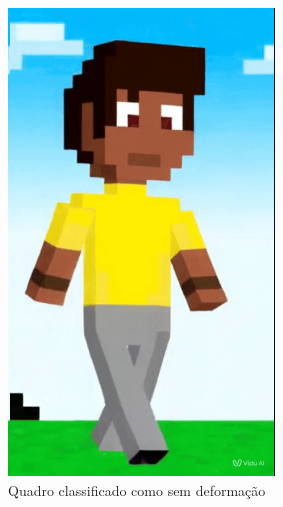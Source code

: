 \begin{figure}[htbp]
    \centering
    \caption{\small Quadros do Vídeo 2 (3D) em cada um dos níveis de deformação}
    \label{fig:viduNiveisDeformacao2}
    \begin{subfigure}{0.32\linewidth}
        \centering
        \includegraphics[width=0.9\linewidth]{figs/vidu/2sem.png}
        \caption{\small Quadro classificado como sem deformação}
        \label{fig:viduDeformacao2Sem}
    \end{subfigure}
    \begin{subfigure}{0.32\linewidth}
        \centering

\end{subfigure}
\end{figure}
